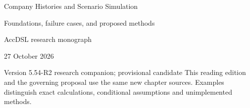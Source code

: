 \documentclass[11pt,a4paper]{report}
\begin{document}
\hypersetup{pageanchor=false}
\begin{titlepage}
{\Huge Company Histories and Scenario Simulation\par}
\vspace{12mm}
{\Large Foundations, failure cases, and proposed methods\par}
\vspace{8mm}
AccDSL research monograph\par 27 October 2026\par Version 5.54-R2 research companion; provisional candidate
\vfill
This reading edition and the governing proposal use the same new chapter sources. Examples distinguish exact calculations, conditional assumptions and unimplemented methods.
\end{titlepage}
\hypersetup{pageanchor=true}
\tableofcontents
\clearpage{}


























\clearpage\label{sim:body-end}

\begingroup\raggedright
\endgroup
\end{document}
